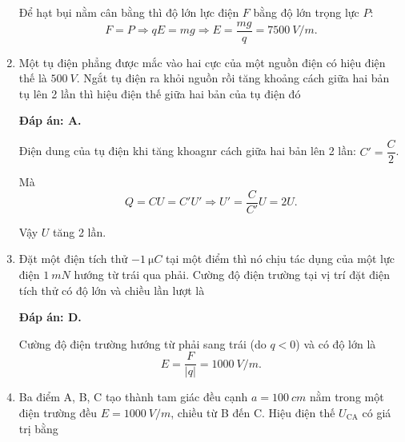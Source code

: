 \begin{enumerate}[label=\bfseries Câu \arabic*:]
{		Để hạt bụi nằm cân bằng thì độ lớn lực điện $F$ bằng độ lớn trọng lực $P$:
		$$F=P \Rightarrow qE = mg \Rightarrow E = \dfrac{mg}{q} = \SI{7500}{V/m}.$$
	}
	\item {}
	
	\cauhoi
	{Một tụ điện phẳng được mắc vào hai cực của một nguồn điện có hiệu điện thế là $\SI{500}{V}$. Ngắt tụ điện ra khỏi nguồn rồi tăng khoảng cách giữa hai bản tụ lên 2 lần thì hiệu điện thế giữa hai bản của tụ điện đó
		
	}
	\loigiai
	{	\textbf{Đáp án: A.}
		
		Điện dung của tụ điện khi tăng khoagnr cách giữa hai bản lên 2 lần: $C'=\dfrac{C}{2}$.
		
		Mà $$Q=CU = C'U' \Rightarrow U'=\dfrac{C}{C'}U = 2U.$$
		
		Vậy $U$ tăng 2 lần.
	}
	\item {}
	
	\cauhoi
	{Đặt một điện tích thử $\SI{-1}{\micro C}$ tại một điểm thì nó chịu tác dụng của một lực điện $\SI{1}{mN}$ hướng từ trái qua phải. Cường độ điện trường tại vị trí đặt điện tích thử có độ lớn và chiều lần lượt là
		
	}
	\loigiai
	{	\textbf{Đáp án: D.}
		
		Cường độ điện trường hướng từ phải sang trái (do $q<0$) và có độ lớn là
		$$E=\dfrac{F}{|q|} = \SI{1000}{V/m}.$$
	}
	\item {}
	
	\cauhoi
	{Ba điểm A, B, C tạo thành tam giác đều cạnh $a=\SI{100}{cm}$ nằm trong một điện trường đều $E=\SI{1000}{V/m}$, chiều từ B đến C. Hiệu điện thế $U_\text{CA}$ có giá trị bằng
		
}
\end{enumerate}
